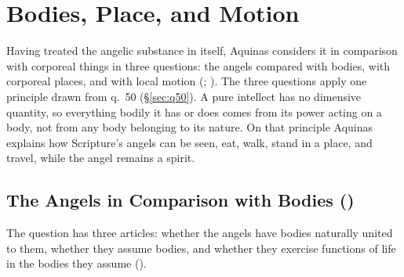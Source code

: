 \section{Bodies, Place, and Motion}\label{sec:bodies}

Having treated the angelic substance in itself, Aquinas considers it in
comparison with corporeal things in three questions: the angels compared
with bodies, with corporeal places, and with local motion (;
). The three questions apply one principle drawn from
q.~50 (\S\ref{sec:q50}). A pure intellect has no dimensive quantity, so
everything bodily it has or does comes from its power acting on a body,
not from any body belonging to its nature. On that principle Aquinas
explains how Scripture's angels can be seen, eat, walk, stand in a place,
and travel, while the angel remains a spirit.

\subsection{The Angels in Comparison with Bodies ()}\label{sec:q51}

The question has three articles: whether the angels have bodies naturally
united to them, whether they assume bodies, and whether they exercise
functions of life in the bodies they assume ().

